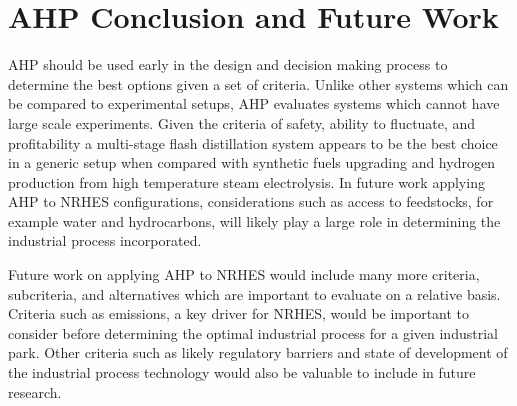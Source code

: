 \newpage
\section{AHP Conclusion and Future Work}

AHP should be used early in the design and decision making process to determine the best options given a set of criteria. Unlike other systems which can be compared to experimental setups, AHP evaluates systems which cannot have large scale experiments. Given the criteria of safety, ability to fluctuate, and profitability a multi-stage flash distillation system appears to be the best choice in a generic setup when compared with synthetic fuels upgrading and hydrogen production from high temperature steam electrolysis. In future work applying AHP to NRHES configurations, considerations such as access to feedstocks, for example water and hydrocarbons, will likely play a large role in determining the industrial process incorporated.

 Future work on applying AHP to NRHES would include many more criteria, subcriteria, and alternatives which are important to evaluate on a relative basis.  Criteria such as emissions, a key driver for NRHES, would be important to consider before determining the optimal industrial process for a given industrial park. Other criteria such as likely regulatory barriers and state of development of the industrial process technology would also be valuable to include in future research.
 
